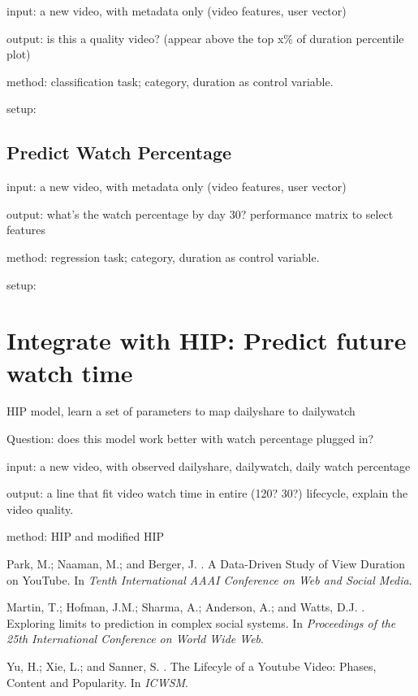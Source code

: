 \documentclass[letterpaper]{article}
\begin{document}
input: a new video, with metadata only (video features, user vector)

output: is this a quality video? (appear above the top x\% of duration percentile plot)

method: classification task; category, duration as control variable.

setup: 

\subsection{Predict Watch Percentage}
input: a new video, with metadata only (video features, user vector)

output: what's the watch percentage by day 30? performance matrix to select features

method: regression task; category, duration as control variable.

setup: 


\section{Integrate with HIP: Predict future watch time}
HIP model, learn a set of parameters to map dailyshare to dailywatch

Question: does this model work better with watch percentage plugged in?

input: a new video, with observed dailyshare, dailywatch, daily watch percentage

output: a line that fit video watch time in entire (120? 30?) lifecycle, explain the video quality.

method: HIP and modified HIP


\begin{thebibliography}{}

Park, M.; Naaman, M.; and Berger, J.
.
\newblock A Data-Driven Study of View Duration on YouTube.
\newblock In \textit{Tenth International AAAI Conference on Web and Social Media}.

Martin, T.; Hofman, J.M.; Sharma, A.; Anderson, A.; and Watts, D.J.
.
\newblock Exploring limits to prediction in complex social systems.
\newblock In \textit{Proceedings of the 25th International Conference on World Wide Web}.

Yu, H.; Xie, L.; and Sanner, S.
.
\newblock The Lifecyle of a Youtube Video: Phases, Content and Popularity.
\newblock In \textit{ICWSM}.
 
\end{thebibliography}

\end{document}
